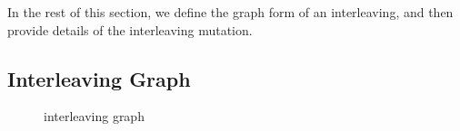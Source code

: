 In the rest of this section, we define the graph form of an
interleaving, and then provide details of the interleaving mutation.





\subsection{Interleaving Graph}
\label{ss:coverage}

\begin{figure}[t]
  \caption{interleaving graph}
  \label{fig:interleaving-graph}
\end{figure}

